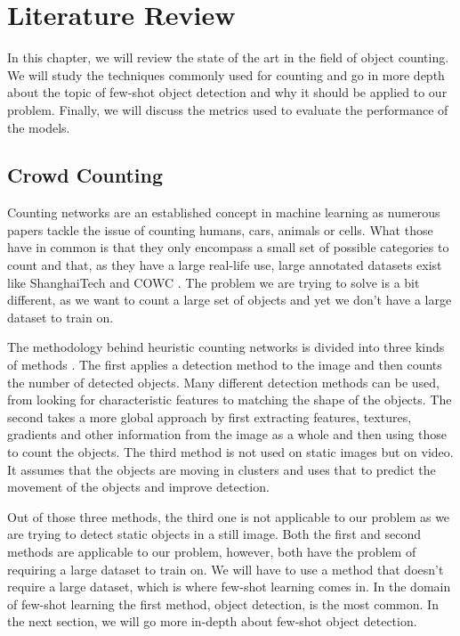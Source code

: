 
\chapter{Literature Review}
In this chapter, we will review the state of the art in the field of object counting. We will study the techniques commonly used for counting and go in more depth about the topic of few-shot object detection and why it should be applied to our problem. Finally, we will discuss the metrics used to evaluate the performance of the models.

\section{Crowd Counting}
Counting networks are an established concept in machine learning as numerous papers tackle the issue of counting humans, cars, animals or cells. What those have in common is that they only encompass a small set of possible categories to count and that, as they have a large real-life use, large annotated datasets exist like ShanghaiTech \cite{Shanghaitech} and COWC \cite{COWC}. The problem we are trying to solve is a bit different, as we want to count a large set of objects and yet we don't have a large dataset to train on.

The methodology behind heuristic counting networks is divided into three kinds of methods \cite{s22145286}. The first applies a detection method to the image and then counts the number of detected objects. Many different detection methods can be used, from looking for characteristic features to matching the shape of the objects. The second takes a more global approach by first extracting features, textures, gradients and other information from the image as a whole and then using those to count the objects. The third method is not used on static images but on video. It assumes that the objects are moving in clusters and uses that to predict the movement of the objects and improve detection.

Out of those three methods, the third one is not applicable to our problem as we are trying to detect static objects in a still image.
Both the first and second methods are applicable to our problem, however, both have the problem of requiring a large dataset to train on. We will have to use a method that doesn't require a large dataset, which is where few-shot learning comes in. In the domain of few-shot learning the first method, object detection, is the most common. In the next section, we will go more in-depth about few-shot object detection.

